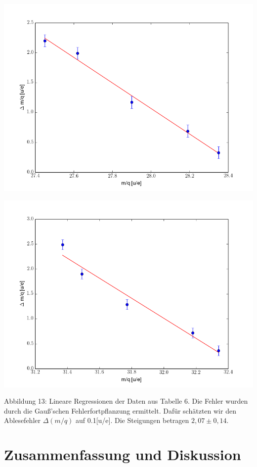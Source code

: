 \begin{center}
\begin{minipage}[t]{0.49\textwidth}
\includegraphics[width=\textwidth]{img/mq1}
\end{minipage}
\begin{minipage}[t]{0.49\textwidth}
\includegraphics[width=\textwidth]{img/mq2}
\end{minipage}
\end{center}

Abbildung 13: Lineare Regressionen der Daten aus Tabelle 6. Die Fehler wurden \hspace*{2,5cm} durch die Gauß’schen Fehlerfortpflanzung ermittelt. Dafür schätzten \hspace*{2,5cm} wir den Ablesefehler $\Delta(m/q)$ auf 0.1[u/e]. Die Steigungen betragen \hspace*{2,5cm} $2,07\pm 0,14$.


\newpage
\section{Zusammenfassung und Diskussion}